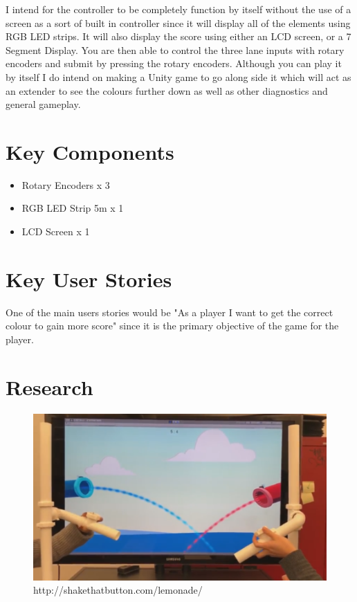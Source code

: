 \documentclass{article}
\begin{document}
I intend for the controller to be completely function by itself without the use of a screen as a sort of built in controller since it will display all of the elements using RGB LED strips. It will also display the score using either an LCD screen, or a 7 Segment Display. You are then able to control the three lane inputs with rotary encoders and submit by pressing the rotary encoders. Although you can play it by itself I do intend on making a Unity game to go along side it which will act as an extender to see the colours further down as well as other diagnostics and general gameplay.

\section{Key Components}

\begin{itemize}
    \item Rotary Encoders x 3
    \item RGB LED Strip 5m x 1
    \item LCD Screen x 1
\end{itemize}

\section{Key User Stories}

One of the main users stories would be "As a player I want to get the correct colour to gain more score" since it is the primary objective of the game for the player.

\section{Research}

\begin{figure}[ht]
  \includegraphics[width=\textwidth,height=\textheight,keepaspectratio]{lemonade.PNG}
  \caption{http://shakethatbutton.com/lemonade/}
  \label{fig:Lemonade}
\end{figure}
\end{document}
